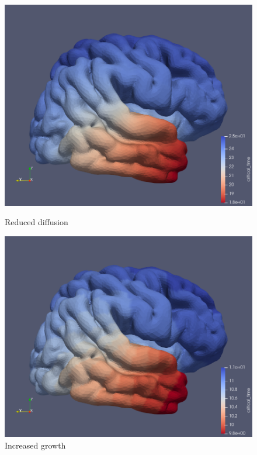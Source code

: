 \documentclass[12pt, letterpaper]{article}
\begin{document}
\begin{figure}[]
    \vspace{0.5cm}
    
    \begin{minipage}{0.4\textwidth}
        \centering
        \includegraphics[width=\linewidth]{pics/reddiff.png}
        \caption{Reduced diffusion}
    \end{minipage}
    \hfill
    \begin{minipage}{0.4\textwidth}
        \centering
        \includegraphics[width=\linewidth]{pics/incgro.png}
        \caption{Increased growth}
    \end{minipage}

\end{figure}
\end{document}
